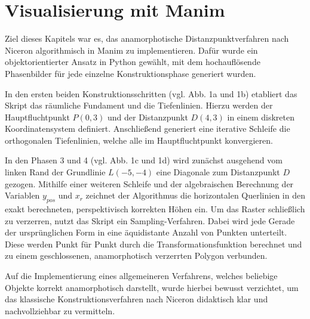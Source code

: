 \section{Visualisierung mit Manim}

Ziel dieses Kapitels war es, das anamorphotische Distanzpunktverfahren nach Niceron algorithmisch in Manim zu implementieren. Dafür wurde ein objektorientierter Ansatz in Python gewählt, mit dem hochauflösende Phasenbilder für jede einzelne Konstruktionsphase generiert wurden.

In den ersten beiden Konstruktionsschritten (vgl. Abb. 1a und 1b) etabliert das Skript das räumliche Fundament und die Tiefenlinien. Hierzu werden der Hauptfluchtpunkt $P(0,3)$ und der Distanzpunkt $D(4,3)$ in einem diskreten Koordinatensystem definiert. Anschließend generiert eine iterative Schleife die orthogonalen Tiefenlinien, welche alle im Hauptfluchtpunkt konvergieren. 

In den Phasen 3 und 4 (vgl. Abb. 1c und 1d) wird zunächst ausgehend vom linken Rand der Grundlinie $L(-5,-4)$ eine Diagonale zum Distanzpunkt $D$ gezogen. Mithilfe einer weiteren Schleife und der algebraischen Berechnung der Variablen $y_{pos}$ und $x_r$ zeichnet der Algorithmus die horizontalen Querlinien in den exakt berechneten, perspektivisch korrekten Höhen ein. Um das Raster schließlich zu verzerren, nutzt das Skript ein Sampling-Verfahren. Dabei wird jede Gerade der ursprünglichen Form in eine äquidistante Anzahl von Punkten unterteilt. Diese werden Punkt für Punkt durch die Transformationsfunktion berechnet und zu einem geschlossenen, anamorphotisch verzerrten Polygon verbunden. 

Auf die Implementierung eines allgemeineren Verfahrens, welches beliebige Objekte korrekt anamorphotisch darstellt, wurde hierbei bewusst verzichtet, um das klassische Konstruktionsverfahren nach Niceron didaktisch klar und nachvollziehbar zu vermitteln.


